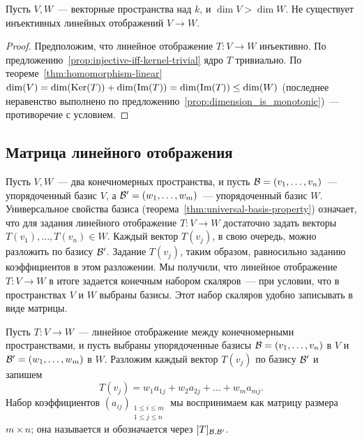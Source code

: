 \begin{corollary}\label{cor:no-injective-maps}
Пусть $V,W$~--- векторные пространства над $k$,
и $\dim V > \dim W$. Не существует инъективных линейных
отображений $V\to W$.
\end{corollary}
\begin{proof}
Предположим, что линейное отображение $T\colon V\to W$ инъективно.
По предложению~\ref{prop:injective-iff-kernel-trivial}
ядро $T$ тривиально. По теореме~\ref{thm:homomorphism-linear}
$\dim(V) = \dim(\operatorname{Ker}(T)) + \dim(\operatorname{Im}(T)) = \dim(\operatorname{Im}(T))
\leq \dim(W)$ (последнее неравенство выполнено
по предложению~\ref{prop:dimension_is_monotonic})~---
противоречие с условием.
\end{proof}

\subsection{Матрица линейного отображения}

Пусть $V,W$~--- два конечномерных пространства,
и пусть $\mathcal B = (v_1,\dots,v_n)$~--- упорядоченный базис $V$,
а $\mathcal B' = (w_1,\dots,w_m)$~--- упорядоченный базис $W$.
Универсальное свойства базиса
(теорема~\ref{thm:universal-basis-property}) означает, что
для задания линейного отображение $T\colon V\to W$
достаточно задать векторы $T(v_1),\dots,T(v_n)\in W$.
Каждый вектор $T(v_j)$, в свою очередь, можно разложить
по базису $\mathcal B'$. Задание $T(v_j)$, таким образом, равносильно
заданию коэффициентов в этом разложении.
Мы получили, что линейное отображение $T\colon V\to W$
в итоге задается конечным набором скаляров~--- при условии, что
в пространствах $V$ и $W$ выбраны базисы.
Этот набор скаляров удобно записывать в виде матрицы.

\begin{definition}\label{dfn:matrix-of-linear-map}
Пусть $T\colon V\to W$~--- линейное отображение между
конечномерными пространствами, и пусть выбраны
упорядоченные базисы
$\mathcal B = (v_1,\dots,v_n)$ в $V$
и $\mathcal B' = (w_1,\dots,w_m)$ в $W$.
Разложим каждый вектор $T(v_j)$ по базису $\mathcal B'$
и запишем
$$
T(v_j) = w_1a_{1j} + w_2a_{2j} + \dots + w_ma_{mj}.
$$
Набор коэффициентов $(a_{ij})_{\substack{1\leq i\leq m \\
1\leq j\leq n}}$ мы воспринимаем как матрицу
размера $m\times n$; она называется
 и обозначается через $[T]_{\mathcal B,\mathcal B'}$.
\end{definition}

